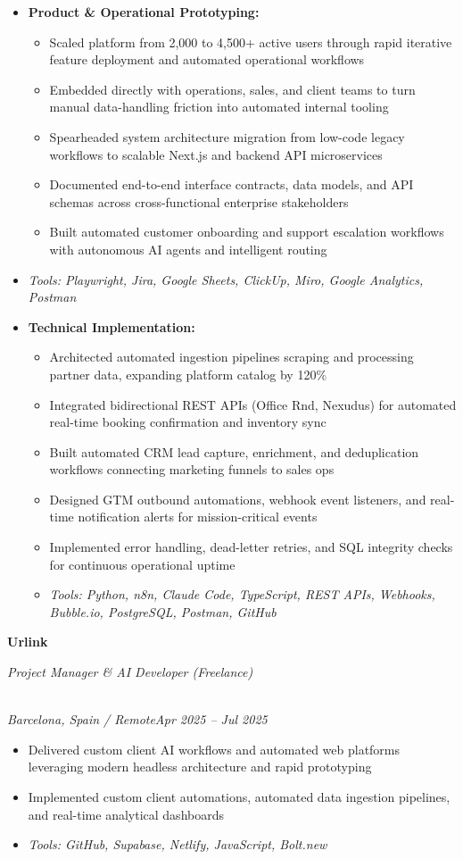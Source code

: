 \documentclass[a4paper,10pt]{article}
\newcommand{\role}[4]{\vspace{2pt}\noindent\hspace{0.6em}\parbox[t]{0.38\textwidth}{\raggedright\textbf{#1}}\hfill\parbox[t]{0.58\textwidth}{\raggedleft\textit{#2}}\\{\textit{#3}\hfill\textit{#4}}\vspace{1pt}}
\begin{document}
\begin{itemize}
\item \textbf{Product \& Operational Prototyping:}
\begin{itemize}[label=--]
\item Scaled platform from 2,000 to 4,500+ active users through rapid iterative feature deployment and automated operational workflows
\item Embedded directly with operations, sales, and client teams to turn manual data-handling friction into automated internal tooling
\item Spearheaded system architecture migration from low-code legacy workflows to scalable Next.js and backend API microservices
\item Documented end-to-end interface contracts, data models, and API schemas across cross-functional enterprise stakeholders
\item Built automated customer onboarding and support escalation workflows with autonomous AI agents and intelligent routing
\end{itemize}
\item \textit{Tools: Playwright, Jira, Google Sheets, ClickUp, Miro, Google Analytics, Postman}
\item \textbf{Technical Implementation:}
\begin{itemize}[label=--]
\item Architected automated ingestion pipelines scraping and processing partner data, expanding platform catalog by 120\%
\item Integrated bidirectional REST APIs (Office Rnd, Nexudus) for automated real-time booking confirmation and inventory sync
\item Built automated CRM lead capture, enrichment, and deduplication workflows connecting marketing funnels to sales ops
\item Designed GTM outbound automations, webhook event listeners, and real-time notification alerts for mission-critical events
\item Implemented error handling, dead-letter retries, and SQL integrity checks for continuous operational uptime
\item \textit{Tools: Python, n8n, Claude Code, TypeScript, REST APIs, Webhooks, Bubble.io, PostgreSQL, Postman, GitHub}
\end{itemize}
\end{itemize}

\role{Urlink}{Project Manager \& AI Developer (Freelance)}{Barcelona, Spain / Remote}{Apr 2025 -- Jul 2025}
\begin{itemize}
\item Delivered custom client AI workflows and automated web platforms leveraging modern headless architecture and rapid prototyping
\item Implemented custom client automations, automated data ingestion pipelines, and real-time analytical dashboards
\item \textit{Tools: GitHub, Supabase, Netlify, JavaScript, Bolt.new}
\end{itemize}
\end{document}
